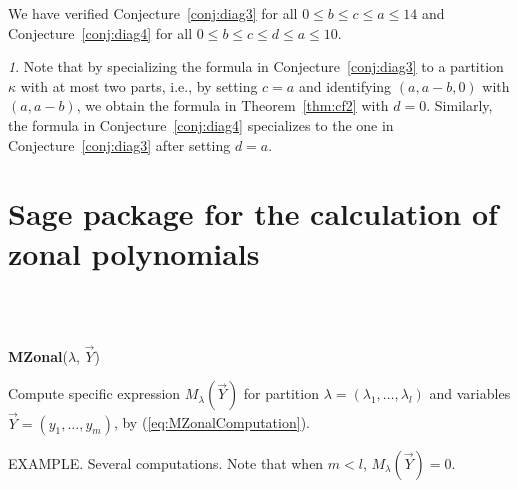 \documentclass[10pt,oneside,american]{amsart}
\numberwithin{equation}{section}
\numberwithin{figure}{section}
\theoremstyle{plain}
\theoremstyle{definition}
\theoremstyle{remark}
\newtheorem{rem}[thm]{\protect\remarkname}
\theoremstyle{plain}
\theoremstyle{definition}
\theoremstyle{plain}
\theoremstyle{plain}
\providecommand{\remarkname}{Remark}
\begin{document}
We have verified Conjecture~\ref{conj:diag3} for all $0\leq b\leq c\leq a\leq
14$ and Conjecture~\ref{conj:diag4} for all $0\leq b\leq c\leq d\leq a\leq
10$.

\begin{rem}
  Note that by specializing the formula in Conjecture~\ref{conj:diag3} to a
  partition~$\kappa$ with at most two parts, i.e., by setting $c=a$ and
  identifying $(a,a-b,0)$ with $(a,a-b)$, we obtain the formula in
  Theorem~\ref{thm:cf2} with $d=0$. Similarly, the formula in
  Conjecture~\ref{conj:diag4} specializes to the one in
  Conjecture~\ref{conj:diag3} after setting $d=a$.
\end{rem}


\section{\label{sec:Package}Sage package for the calculation of zonal polynomials}

~\\
~
%
%

\noindent \textbf{MZonal}($\lambda$, $\vec{Y}$)

Compute specific expression $M_{\lambda}(\vec{Y})$ for partition
$\lambda=(\lambda_{1},\ldots,\lambda_{l})$ and variables $\vec{Y}=(y_{1},\ldots,y_{m})$,
by (\ref{eq:MZonalComputation}).

EXAMPLE. Several computations. Note that when $m<l$, $M_{\lambda}(\vec{Y})=0$. 
\end{document}
